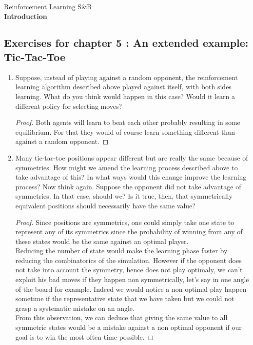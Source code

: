 \documentclass[]{book}
\theoremstyle{definition}
\begin{document}
\begin{center}
{\Large Reinforcement Learning \hspace{0.5cm} S\&B}\\
\textbf{Introduction}\\ %
\end{center}

\vspace{0.2 cm}


\subsection*{Exercises for chapter 5 : An extended example: Tic-Tac-Toe}

\begin{enumerate}
    \item Suppose, instead of playing against a random opponent, the reinforcement learning algorithm described above played against itself, with both sides learning. What do you think would happen in this case? Would it learn a different policy for selecting moves?
    \begin{proof}
	    Both agents will learn to beat each other probably resulting in some equilibrium. For that they would of course learn something different than against a random opponent.
    \end{proof}

    \item Many tic-tac-toe positions appear different but are really the same because of symmetries. How might we amend the learning process described above to take advantage of this? In what ways would this change improve the learning process? Now think again. Suppose the opponent did not take advantage of symmetries. In that case, should we? Is it true, then, that symmetrically equivalent positions should necessarily have the same value?
    \begin{proof}
        Since positions are symmetrics, one could simply take one state to represent any of its symmetrics since the probability of winning from any of these states would be the same against an optimal player.\\
        Reducing the number of state would make the learning phase faster by reducing the combinatorics of the simulation. However if the opponent does not take into account the symmetry, hence does not play optimaly, we can't exploit his bad moves if they happen non symmetrically, let's say in one angle of the board for example. Indeed we would notice a non optimal play happen sometime if the representative state that we have taken but we could not grasp a systematic mistake on an angle.\\
        From this observation, we can deduce that giving the same value to all symmetric states would be a mistake against a non optimal opponent if our goal is to win the most often time possible.
    \end{proof}


\end{enumerate}
\end{document}
